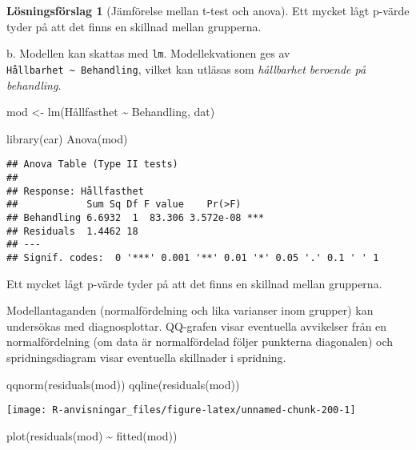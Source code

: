 \documentclass[
]{book}
\newenvironment{Shaded}{\begin{snugshade}}{\end{snugshade}}
\newcommand{\FunctionTok}[1]{\textcolor[rgb]{0.00,0.00,0.00}{#1}}
\newcommand{\NormalTok}[1]{#1}
\newcommand{\OtherTok}[1]{\textcolor[rgb]{0.56,0.35,0.01}{#1}}
\newcommand{\SpecialCharTok}[1]{\textcolor[rgb]{0.00,0.00,0.00}{#1}}
\theoremstyle{definition}
\theoremstyle{definition}
\theoremstyle{definition}
\theoremstyle{definition}
\newtheorem{hypothesis}{Lösningsförslag}[chapter]
\theoremstyle{remark}
\begin{document}
\begin{hypothesis}[Jämförelse mellan t-test och anova]
Ett mycket lågt p-värde tyder på att det finns en skillnad mellan grupperna.

b. Modellen kan skattas med \texttt{lm}. Modellekvationen ges av \texttt{Hållbarhet\ \textasciitilde{}\ Behandling}, vilket kan utläsas som \emph{hållbarhet beroende på behandling}.

\begin{Shaded}
\begin{Highlighting}[]
\NormalTok{mod }\OtherTok{\textless{}{-}} \FunctionTok{lm}\NormalTok{(Hållfasthet }\SpecialCharTok{\textasciitilde{}}\NormalTok{ Behandling, dat)}

\FunctionTok{library}\NormalTok{(car)}
\FunctionTok{Anova}\NormalTok{(mod)}
\end{Highlighting}
\end{Shaded}

\begin{verbatim}
## Anova Table (Type II tests)
## 
## Response: Hållfasthet
##            Sum Sq Df F value    Pr(>F)    
## Behandling 6.6932  1  83.306 3.572e-08 ***
## Residuals  1.4462 18                      
## ---
## Signif. codes:  0 '***' 0.001 '**' 0.01 '*' 0.05 '.' 0.1 ' ' 1
\end{verbatim}

Ett mycket lågt p-värde tyder på att det finns en skillnad mellan grupperna.

Modellantaganden (normalfördelning och lika varianser inom grupper) kan undersökas med diagnosplottar. QQ-grafen visar eventuella avvikelser från en normalfördelning (om data är normalfördelad följer punkterna diagonalen) och spridningsdiagram visar eventuella skillnader i spridning.

\begin{Shaded}
\begin{Highlighting}[]
\FunctionTok{qqnorm}\NormalTok{(}\FunctionTok{residuals}\NormalTok{(mod))}
\FunctionTok{qqline}\NormalTok{(}\FunctionTok{residuals}\NormalTok{(mod))}
\end{Highlighting}
\end{Shaded}

\begin{center}\texttt{[image: R-anvisningar\_files/figure-latex/unnamed-chunk-200-1]} \end{center}

\begin{Shaded}
\begin{Highlighting}[]
\FunctionTok{plot}\NormalTok{(}\FunctionTok{residuals}\NormalTok{(mod) }\SpecialCharTok{\textasciitilde{}} \FunctionTok{fitted}\NormalTok{(mod))}
\end{Highlighting}
\end{Shaded}


\end{hypothesis}
\end{document}
